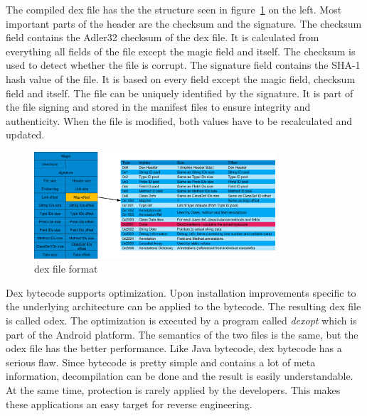 The compiled \gls{dex} file has the the structure seen in figure~\ref{fig:dex} on the left.
Most important parts of the header are the checksum and the signature.
The checksum field contains the Adler32 checksum of the \gls{dex} file. It is calculated from everything all fields of the file except the magic field and itself.
The checksum is used to detect whether the file is corrupt.
The signature field contains the SHA-1 hash value of the file.
It is based on every field except the magic field, checksum field and itself.
The file can be uniquely identified by the signature.
It is part of the file signing and stored in the manifest files to ensure integrity and authenticity.
When the file is modified, both values have to be recalculated and updated.
\cite{developersDalvik} \cite{ehringerDalvik}
\newline
\begin{figure}[h]
    \centering
    \includegraphics[width=0.8\textwidth]{data/dex.png}
    \caption{\gls{dex} file format \cite{andevconDalvikART}}
    \label{fig:dex}
\end{figure}
Dex bytecode supports optimization.
Upon installation improvements specific to the underlying architecture can be applied to the bytecode.
The resulting \gls{dex} file is called \gls{odex}.
The optimization is executed by a program called \textit{dexopt} which is part of the Android platform.
The semantics of the two files is the same, but the \gls{odex} file has the better performance.
\newline
Like Java bytecode, \gls{dex} bytecode has a serious flaw.
Since bytecode is pretty simple and contains a lot of meta information, decompilation can be done and the result is easily understandable.
At the same time, protection is rarely applied by the developers.
This makes these applications an easy target for reverse engineering.
